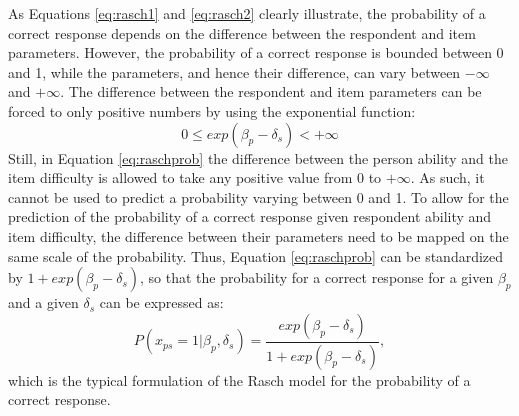 \documentclass[12pt]{book}
\begin{document}
As Equations \ref{eq:rasch1} and \ref{eq:rasch2} clearly illustrate, the probability of a correct response depends on the difference between the respondent and item parameters. 
However, the probability of a correct response is bounded between 0 and 1, while the parameters, and hence their difference, can vary between $- \infty$ and $+ \infty$. 
The difference between the respondent and item parameters can be forced to only positive numbers by using the exponential function: 
\begin{equation}\label{eq:raschprob}
	0 \leq exp(\beta_p - \delta_s) < + \infty
\end{equation}
Still, in Equation \ref{eq:raschprob} the difference between the person ability and the item difficulty is allowed to take any positive value from 0 to $+ \infty$. As such, it cannot be used to predict a probability varying between 0 and 1. 
To allow for the prediction of the probability of a correct response given respondent ability and item difficulty, the difference between their parameters need to be mapped on the same scale of the probability. Thus, Equation \ref{eq:raschprob} can be standardized by $1 + exp(\beta_p - \delta_s)$, so that the probability for a correct response for a given $\beta_p$ and a given $\delta_s$ can be expressed as: 
\begin{equation}\label{eq:raschcorrect}
	P(x_{ps} = 1 | \beta_p, \delta_s) = \frac{exp(\beta_p - \delta_s)}{1 + exp(\beta_p - \delta_s)},
\end{equation}
which is the typical formulation of the Rasch model for the probability of a correct response. 
\end{document}
